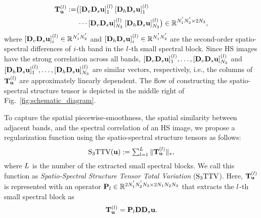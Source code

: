 \begin{equation}
	\begin{split}
		\label{eq:SSST}
		\mathbf{T}_{\mathbf{u}}^{(l)} :=  
		&\bigl( \lbrack \mathbf{D}_{v} \mathbf{D}_{s} \mathbf{u} \rbrack_{1}^{(l)} \: 
		\lbrack\mathbf{D}_{h} \mathbf{D}_{s} \mathbf{u} \rbrack_{1}^{(l)} \\ 
		& \: \cdots \lbrack \mathbf{D}_{v} \mathbf{D}_{s} \mathbf{u} \rbrack_{N_{3}}^{(l)} \:
		\lbrack\mathbf{D}_{h} \mathbf{D}_{s} \mathbf{u} \rbrack_{N_{3}}^{(l)} 
		\bigr) \in \mathbb{R}^{N_{1}^{'} N_{2}^{'} \times 2N_{3}},
	\end{split}
\end{equation}
where $\lbrack \mathbf{D}_{v} \mathbf{D}_{s} \mathbf{u} \rbrack_{i}^{(l)} \in \mathbb{R}^{N_{1}^{'} N_{2}^{'}}$ and $\lbrack \mathbf{D}_{h} \mathbf{D}_{s} \mathbf{u} \rbrack_{i}^{(l)} \in \mathbb{R}^{N_{1}^{'} N_{2}^{'}}$ are the second-order spatio-spectral differences of $i$-th band in the $l$-th small spectral block. Since HS images have the strong correlation across all bands, $\lbrack \mathbf{D}_{v} \mathbf{D}_{s} \mathbf{u} \rbrack_{1}^{(l)}, \ldots, \lbrack \mathbf{D}_{v} \mathbf{D}_{s} \mathbf{u} \rbrack_{N_{3}}^{(l)}$ and $\lbrack \mathbf{D}_{h} \mathbf{D}_{s} \mathbf{u} \rbrack_{1}^{(l)}, \ldots, \lbrack \mathbf{D}_{h} \mathbf{D}_{s} \mathbf{u} \rbrack_{N_{3}}^{(l)}$ are similar vectors, respectively, i.e., the columns of $\mathbf{T}_{\mathbf{u}}^{(l)}$ are approximately linearly dependent. The flow of constructing the spatio-spectral structure tensor is depicted in the middle right of Fig.~\ref{fig:schematic_diagram}.


To capture the spatial piecewise-smoothness, the spatial similarity between adjacent bands, and the spectral correlation of an HS image, we propose a regularization function using the spatio-spectral structure tensors as follows:
\begin{equation}
	\label{eq:S3TTV_Lu}
	\textstyle {\text{S}_{3} \text{TTV}} (\mathbf{u}) := \sum_{l=1}^{L} \| \mathbf{T}_{\mathbf{u}}^{(l)} \|_{*},
\end{equation}
where $L$ is the number of the extracted small spectral blocks.
We call this function as \textit{Spatio-Spectral Structure Tensor Total Variation} (${\text{S}_{3} \text{TTV}}$).
Here, $\mathbf{T}_{\mathbf{u}}^{(l)}$ is represented with an operator $\mathbf{P}_{l} \in \mathbb{R}^{2 N_{1}^{'} N_{2}^{'} N_{3} \times 2 N_{1} N_{2} N_{3}}$ that extracts the $l$-th small spectral block as
\begin{equation}
	\label{eq:rewrite_Lu}
	\mathbf{T}_{\mathbf{u}}^{(l)}
	= \mathbf{P}_{l} \mathbf{D} \mathbf{D}_{s} \mathbf{u}.
\end{equation}


